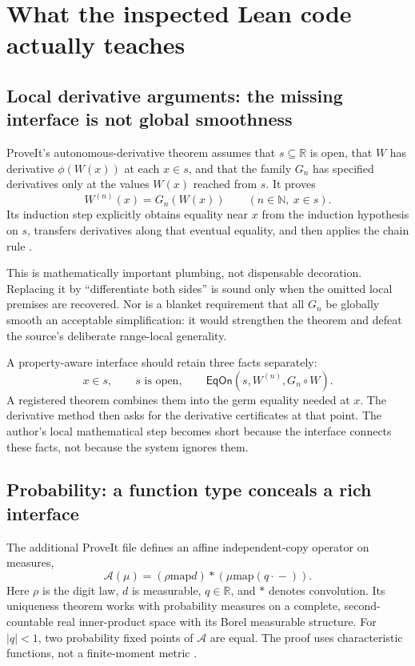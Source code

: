 \documentclass[11pt,a4paper]{article}
\newcommand{\R}{\mathbb R}
\newcommand{\N}{\mathbb N}
\newcommand{\EqOn}{\mathsf{EqOn}}
\theoremstyle{definition}
\begin{document}
\section{What the inspected Lean code actually teaches}\label{sec:corpus}
\subsection{Local derivative arguments: the missing interface is not global smoothness}
ProveIt's autonomous-derivative theorem assumes that $s\subseteq\R$ is open,
that $W$ has derivative $\phi(W(x))$ at each $x\in s$, and that the family
$G_n$ has specified derivatives only at the values $W(x)$ reached from $s$.
It proves
\[
 W^{(n)}(x)=G_n(W(x)) \qquad (n\in\N,\ x\in s).
\]
Its induction step explicitly obtains equality near $x$ from the induction
hypothesis on $s$, transfers derivatives along that eventual equality, and then
applies the chain rule \cite{autonomous}.

This is mathematically important plumbing, not dispensable decoration. Replacing
it by ``differentiate both sides'' is sound only when the omitted local premises
are recovered. Nor is a blanket requirement that all $G_n$ be globally smooth an
acceptable simplification: it would strengthen the theorem and defeat the
source's deliberate range-local generality.

A property-aware interface should retain three facts separately:
\[
 x\in s,\qquad s\text{ is open},\qquad
 \EqOn(s,W^{(n)},G_n\circ W).
\]
A registered theorem combines them into the germ equality needed at $x$.
The derivative method then asks for the derivative certificates at that point.
The author's local mathematical step becomes short because the interface
connects these facts, not because the system ignores them.

\subsection{Probability: a function type conceals a rich interface}
The additional ProveIt file defines an affine independent-copy operator on
measures,
\begin{equation}\label{eq:affinelaw}
 \mathcal A(\mu)=(\rho\mathbin{\mathrm{map}}d)
       * (\mu\mathbin{\mathrm{map}}(q\,\boldsymbol\cdot\,-)).
\end{equation}
Here $\rho$ is the digit law, $d$ is measurable, $q\in\R$, and $*$ denotes
convolution. Its uniqueness theorem works with probability measures on a
complete, second-countable real inner-product space with its Borel measurable
structure. For $|q|<1$, two probability fixed points of $\mathcal A$ are equal.
The proof uses characteristic functions, not a finite-moment metric
\cite{affine}.
\end{document}
